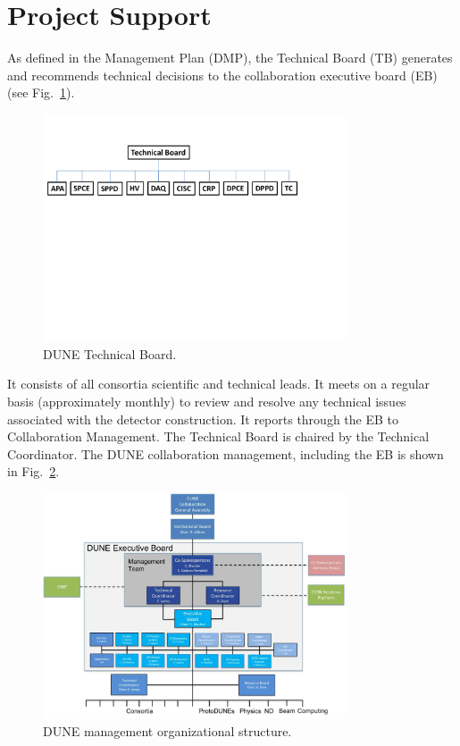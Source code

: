 \section{Project Support}
\label{sec:fdsp-coord-supp}

As defined in the  Management Plan (DMP), the 
Technical Board (TB) generates and recommends technical decisions to the 
collaboration executive board (EB) (see Fig.~\ref{fig:TB_org}).
\begin{figure}[htb]
  \begin{center}
    \includegraphics[width=0.8\textwidth]{far-detector-generic/figures/TB_Org_Chart}
    \caption{DUNE Technical Board.}
    \label{fig:TB_org}
  \end{center}
\end{figure}
It consists of all consortia scientific and technical leads. It meets
on a regular basis (approximately monthly) to review and resolve any
technical issues associated with the detector construction. It reports
through the EB to Collaboration Management. The
 Technical Board is chaired by the Technical
Coordinator. The DUNE collaboration management, including the EB is shown in
Fig.~\ref{fig:DUNE_org}.
\begin{figure}[htb]
  \begin{center}
    \includegraphics[width=0.8\textwidth]{far-detector-generic/figures/DUNE_mgmt}
    \caption{DUNE management organizational structure.}
    \label{fig:DUNE_org}
  \end{center}
\end{figure}



